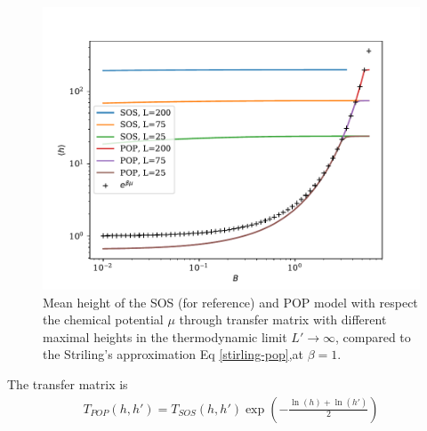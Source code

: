 \begin{figure}
\centering
\includegraphics{pop/hauteur-tm-pop-sos.pdf}
\caption{Mean height of the SOS (for reference) and POP model with respect the chemical potential $\mu$ through transfer matrix with different maximal heights in the thermodynamic limit $L'\to \infty$, compared to the Striling's approximation Eq \eqref{stirling-pop},at $\beta=1$. }
\label{haut-tm-pop} 
\end{figure}

The transfer matrix is
\begin{align}
T_{POP}(h,h') = T_{SOS}(h,h') \exp \left(- \frac{\ln(h)+\ln(h')}{2} \right)
\end{align}

